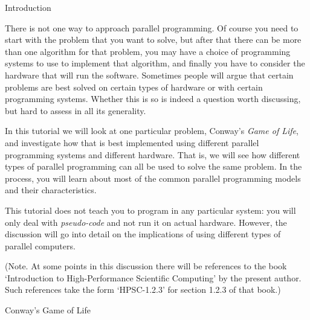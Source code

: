  {Introduction}

There is not one way to approach parallel programming. 
Of course you need to start with the problem that you want to solve,
but after that there can be more than one algorithm for that problem,
you may have a choice of programming systems to use
to implement that algorithm, and finally 
you have to consider the hardware that will run 
the software. Sometimes people will argue that certain problems are best solved
on certain types of hardware or with certain programming systems.
Whether this is so is indeed a question worth discussing, but 
hard to assess in all its generality.

In this tutorial we will look at one particular problem,
Conway's \emph{Game of Life}, and investigate how that is best
implemented using different parallel programming systems and
different hardware. That is, we will see how different types
of parallel programming can all be used to solve the same problem.
In the process, you will learn about most of the common
parallel programming models and their characteristics.

This tutorial does not teach you to program in any particular
system: you  will only deal with \emph{pseudo-code}
and not run it on actual hardware. However, the discussion
will go into detail on the implications of using different
types of parallel computers.

(Note. At some points in this discussion there will be references
to the book `Introduction to High-Performance Scientific Computing'
by the present author. Such references take the form `HPSC-1.2.3'
for section 1.2.3 of that book.)

 {Conway's Game of Life}

